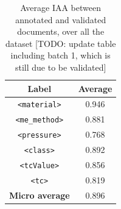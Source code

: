 \documentclass[fleqn,10pt]{wlscirep}
\begin{document}

\begin{table}[ht]
    \centering
    \begin{tabular}{ | c | c | } 
    \hline
        \textbf{Label} & \textbf{Average}\\
    \hline
        \texttt{<material>}     &   0.946   \\
        \texttt{<me\_method>}   &	0.881   \\
        \texttt{<pressure>}     &	0.768   \\
        \texttt{<class>}        &	0.892   \\
        \texttt{<tcValue>}      &	0.856   \\
        \texttt{<tc>}           &	0.819   \\
    \hline
        \textbf{Micro average}        &	0.896	\\
    \hline
    \end{tabular}
    \caption{Average IAA between annotated and validated documents, over all the dataset [TODO: update table including batch 1, which is still due to be validated]}
    \label{table:average-iaa}
\end{table}
\end{document}
